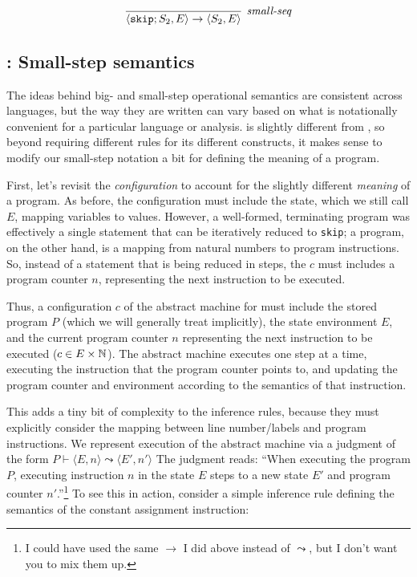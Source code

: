 \documentclass[11pt]{article}
\begin{document}
\begin{equation*}
\infer[\textit{small-seq}]{\langle \mathtt{skip};S_2, E \rangle \rightarrow
  \langle S_2,E \rangle}{}
\end{equation*}


\subsection{\WhileThAddr: Small-step semantics}

The ideas behind big- and small-step operational semantics are consistent
across languages, but the way they are written can vary based on what is
notationally convenient for a particular language or analysis.  
\WhileThAddr is slightly different from \WhileLang, so beyond requiring different rules for its 
different constructs, it makes sense to modify our small-step notation a bit for defining the 
meaning of a \WhileThAddr program.

First, let's revisit the \emph{configuration} to account for the slightly different \emph{meaning} of a
\WhileThAddr program.  As before, the configuration must include the state, which we still call $E$, mapping 
variables to values. However, a well-formed, terminating \WhileLang program
was effectively a single statement that can be iteratively reduced to
\texttt{skip}; a \WhileThAddr program, on the other hand, is a mapping from
natural numbers to program instructions. 
So, instead of a statement that is being reduced in steps, the \WhileThAddr $c$ must
includes a program counter $n$, representing the next instruction to be
executed.  

Thus, a configuration $c$ of the abstract machine for \WhileThAddr
must include the stored program $P$ (which we will generally treat implicitly),
the state environment $E$, and the current program counter $n$
representing the next instruction to be executed ($c \in E \times \mathbb{N}$). 
The abstract machine executes one step at a time, executing the instruction that
the program counter points to, and updating the program counter and environment
according to the semantics of that instruction.  

This adds a tiny bit of complexity to the inference rules, because
they must explicitly consider the mapping between line number/labels and program
instructions.  We represent execution of
the abstract machine via a judgment of the form $P \vdash \langle E,n \rangle
\leadsto \langle E',n' \rangle$ The judgment reads: ``When executing the program $P$,
executing instruction $n$ in the state $E$ steps to a new state $E'$
and program counter $n'$.''\footnote{I could have used the same $\rightarrow$ I
  did above instead of $\leadsto$, but I don't want you to mix them up.}
To see this in action, consider a simple inference rule defining the semantics of the constant
 assignment instruction:
\end{document}
